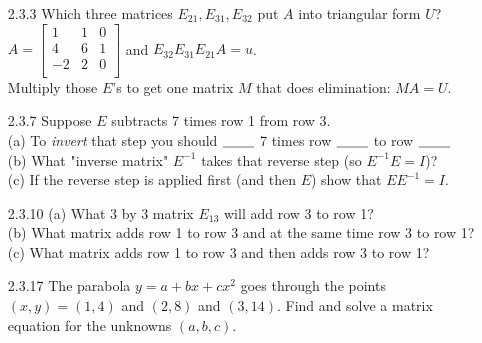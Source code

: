 \documentclass[10pt,twoside,reqno]{article}
\begin{document}
\begin{enumerate}
\item[2.3.3]Which three matrices $E_{21} , E_{31} , E_{32}$ put $A$ into triangular form $U$? \\
\vspace{3mm}
\hspace{100pt}
$
$$
A=
\begin{bmatrix}
1&1&0\\
4&6&1\\
-2&2&0\\
\end{bmatrix}
$$
$
\hspace{10pt}
and
\hspace{10pt}
$E_{32}E_{31}E_{21}A=u$.\\
\vspace{3mm}
Multiply those $E$'s to get one matrix $M$ that does elimination: $MA=U$. 
\vspace{3mm}
\item[2.3.7]Suppose $E$ subtracts 7 times row 1 from row 3.\\
\hspace{25pt}(a) To \textit{invert} that step you should $\underline{\hspace{8mm}}$ 7 times row $\underline{\hspace{8mm}}$ to row $\underline{\hspace{8mm}}$ \\
\hspace{25pt}(b) What "inverse matrix" $E^{-1}$ takes that reverse step (so $E^{-1}E = I$)? \\
\hspace{25pt}(c) If the reverse step is applied first (and then $E$) show that $E E^{-1} = I$. 
\vspace{3mm}
\item[2.3.10](a) What 3 by 3 matrix $E_{13}$ will add row 3 to row 1? \\
(b) What matrix adds row 1 to row 3 and at the same time row 3 to row 1? \\
(c) What matrix adds row 1 to row 3 and then adds row 3 to row 1?
\vspace{3mm}
\item[2.3.17]The parabola $y = a + bx + cx^2$ goes through the points $(x, y) = (1,4)$ and $(2,8)$ and $(3, 14)$. Find and solve a matrix equation for the unknowns $(a, b, c)$. 

\end{enumerate}
\end{document}
